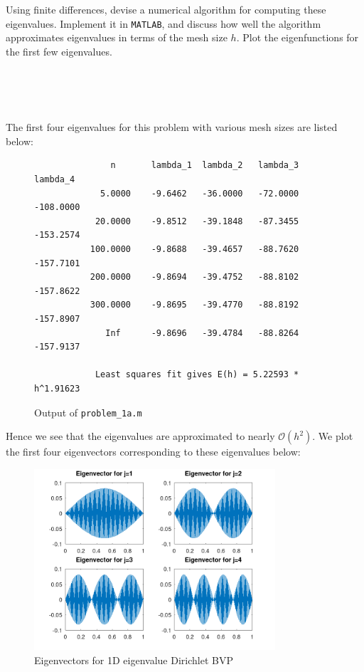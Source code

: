 Using finite differences, devise a numerical algorithm for computing these eigenvalues. Implement it in \texttt{MATLAB},
and discuss how well the algorithm approximates eigenvalues in terms of the mesh size $h$. Plot the eigenfunctions for 
the first few eigenvalues.

\begin{solution}\ \\\\
    \ \\
    \newpage

    \noindent The first four eigenvalues for this problem with various mesh sizes are listed below:

    \begin{figure}[h]
        \begin{verbatim}
               n       lambda_1  lambda_2   lambda_3  lambda_4
             5.0000    -9.6462   -36.0000   -72.0000  -108.0000
            20.0000    -9.8512   -39.1848   -87.3455  -153.2574
           100.0000    -9.8688   -39.4657   -88.7620  -157.7101
           200.0000    -9.8694   -39.4752   -88.8102  -157.8622
           300.0000    -9.8695   -39.4770   -88.8192  -157.8907
              Inf      -9.8696   -39.4784   -88.8264  -157.9137   
         
            Least squares fit gives E(h) = 5.22593 * h^1.91623
        \end{verbatim}
        \caption{Output of \texttt{problem\_1a.m}}
    \end{figure}

    Hence we see that the eigenvalues are approximated to nearly $\mathcal{O}(h^2)$. We plot the first four eigenvectors
    corresponding to these eigenvalues below:

    \begin{figure}[h]
        \centering
        \includegraphics[width=0.80\textwidth]{problem_1a_eigenvectors.png}
        \caption{Eigenvectors for 1D eigenvalue Dirichlet BVP}
    \end{figure}
\end{solution}